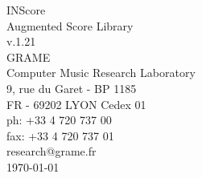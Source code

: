 \documentclass[a4paper]{book}
\begin{document}
\begin{titlepage}
\vspace*{7cm}
\begin{center}
{\huge INScore\\ Augmented Score Library \\[1ex]\large v.1.21}\\
\vspace*{2cm}
{\large GRAME \\ Computer Music Research Laboratory}\\
\vspace*{0.5cm}
{\small 9, rue du Garet - BP 1185}\\
{\small FR - 69202 LYON Cedex 01}\\
\vspace*{0.5cm}
{\small ph:  +33 4 720 737 00}\\
{\small fax: +33 4 720 737 01}\\
\vspace*{0.5cm}
{\small research@grame.fr}\\
\vspace*{0.5cm}
\today 
\end{center}
\end{titlepage}
\clearemptydoublepage
{}
\tableofcontents
\clearemptydoublepage
{}
\end{document}
